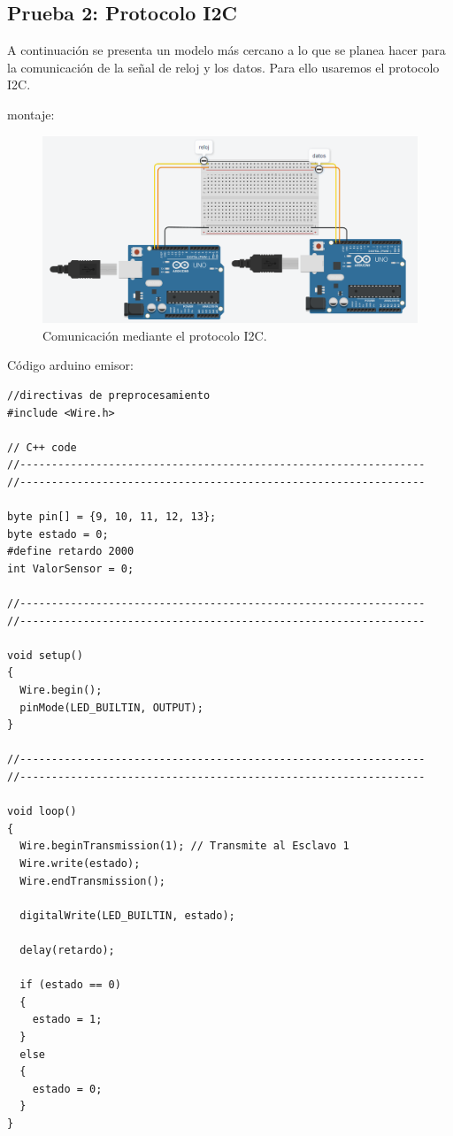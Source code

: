 \documentclass{article}
\begin{document}
\subsection{Prueba 2: Protocolo I2C}\label{intento2}
A continuación se presenta un modelo más cercano a lo que se planea hacer para la comunicación de la señal de reloj y los datos. Para ello usaremos el protocolo I2C.

montaje:
\begin{figure}[h]
\includegraphics[scale=0.5]{emisorReceptor2.png}
\centering
\caption{Comunicación mediante el protocolo I2C.}
\label{fig:emisorReceptor2}
\end{figure}

Código arduino emisor:
\begin{lstlisting}[style=myArduino]//directivas de preprocesamiento
#include <Wire.h>

// C++ code
//----------------------------------------------------------------
//----------------------------------------------------------------

byte pin[] = {9, 10, 11, 12, 13};
byte estado = 0;
#define retardo 2000
int ValorSensor = 0;

//----------------------------------------------------------------
//----------------------------------------------------------------

void setup()
{
  Wire.begin();
  pinMode(LED_BUILTIN, OUTPUT);
}

//----------------------------------------------------------------
//----------------------------------------------------------------

void loop()
{
  Wire.beginTransmission(1); // Transmite al Esclavo 1
  Wire.write(estado);
  Wire.endTransmission();
  
  digitalWrite(LED_BUILTIN, estado);
  
  delay(retardo);
  
  if (estado == 0)
  {
    estado = 1;
  }
  else
  {
    estado = 0;
  }
}
 
\end{lstlisting}
\end{document}
